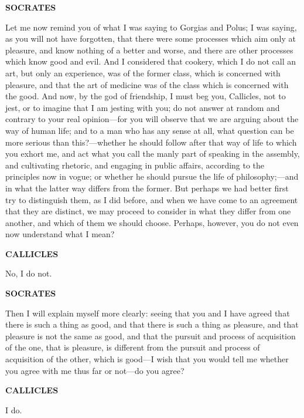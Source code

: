 \documentclass[11pt,letter]{article}
\begin{document}
\par \textbf{SOCRATES}
\par   Let me now remind you of what I was saying to Gorgias and Polus; I was saying, as you will not have forgotten, that there were some processes which aim only at pleasure, and know nothing of a better and worse, and there are other processes which know good and evil. And I considered that cookery, which I do not call an art, but only an experience, was of the former class, which is concerned with pleasure, and that the art of medicine was of the class which is concerned with the good. And now, by the god of friendship, I must beg you, Callicles, not to jest, or to imagine that I am jesting with you; do not answer at random and contrary to your real opinion—for you will observe that we are arguing about the way of human life; and to a man who has any sense at all, what question can be more serious than this?—whether he should follow after that way of life to which you exhort me, and act what you call the manly part of speaking in the assembly, and cultivating rhetoric, and engaging in public affairs, according to the principles now in vogue; or whether he should pursue the life of philosophy;—and in what the latter way differs from the former. But perhaps we had better first try to distinguish them, as I did before, and when we have come to an agreement that they are distinct, we may proceed to consider in what they differ from one another, and which of them we should choose. Perhaps, however, you do not even now understand what I mean?

\par \textbf{CALLICLES}
\par   No, I do not.

\par \textbf{SOCRATES}
\par   Then I will explain myself more clearly:  seeing that you and I have agreed that there is such a thing as good, and that there is such a thing as pleasure, and that pleasure is not the same as good, and that the pursuit and process of acquisition of the one, that is pleasure, is different from the pursuit and process of acquisition of the other, which is good—I wish that you would tell me whether you agree with me thus far or not—do you agree?

\par \textbf{CALLICLES}
\par   I do.
\end{document}
